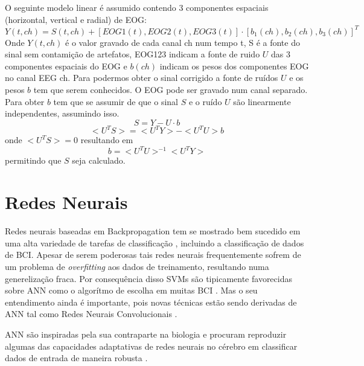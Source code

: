 \par
O seguinte modelo linear \'e assumido contendo 3 componentes espaciais (horizontal, vertical e radial) de \ac{EOG}: 
\begin{equation}
Y(t,ch)=S(t,ch)+[EOG1(t),EOG2(t),EOG3(t)]
\cdotp
[b_1(ch),b_2(ch),b_3(ch)]^T
\end{equation}
Onde $Y(t,ch)$ \'e o valor gravado de cada canal ch num tempo t, S \'e a fonte do sinal sem contami\c{c}\~ao de artefatos, EOG123 indicam a fonte de ruido $U$ das 3 componentes espaciais do EOG e $b(ch)$ indicam os pesos dos componentes EOG no canal \ac{EEG} ch.
Para podermos obter o sinal corrigido a fonte de ru\'idos $U$ e os pesos $b$ tem que serem conhecidos.
O \ac{EOG} pode ser gravado num canal separado.
Para obter $b$  tem que se assumir de que o sinal $S$ e o ru\'ido $U$ s\~ao linearmente independentes, assumindo isso.
\begin{equation}
S=Y-U \cdotp b
\end{equation}
\begin{equation}
<U^T S>=<U^T Y> - <U^T U>b
\end{equation}
onde $<U^T S>=0$ resultando em
\begin{equation}
b=<U^T U>^{-1} <U^T Y>
\end{equation}
permitindo que $S$ seja calculado.
\clearpage
\section{Redes Neurais}
\par
Redes neurais baseadas em Backpropagation tem se mostrado bem sucedido em uma alta variedade de tarefas de classifica\c{c}\~ao , incluindo a classifica\c{c}\~ao de dados de \ac{BCI}.
Apesar de serem poderosas tais redes neurais frequentemente sofrem de um problema de \textit{overfitting} aos dados de treinamento, resultando numa genereliza\c{c}\~ao fraca.
Por consequ\^encia disso \ac{SVM}s s\~ao tipicamente favorecidas sobre \ac{ANN} como o algor\'itmo de escolha em muitas \ac{BCI} \cite{RAO}. Mas o seu entendimento ainda \'e importante, pois novas t\'ecnicas est\~ao sendo derivadas de \ac{ANN} tal como Redes Neurais Convolucionais \cite{nigam2020}. 
\par
\ac{ANN} s\~ao inspiradas pela sua contraparte na biologia e procuram reproduzir algumas das capacidades adaptativas de redes neurais no c\'erebro em classificar dados de entrada de maneira robusta \cite{Haykin2008}. 

